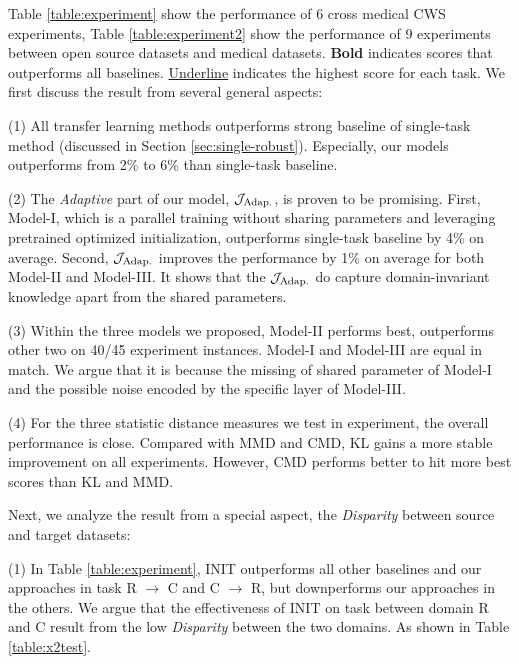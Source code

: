 Table \ref{table:experiment} show the performance of 6 cross medical CWS experiments, Table \ref{table:experiment2} show the performance of 9 experiments between open source datasets and medical datasets. 
\textbf{Bold} indicates scores that outperforms all baselines. \underline{Underline} indicates the highest score for each task.
We first discuss the result from several general aspects:

(1) All transfer learning methods outperforms strong baseline of single-task method (discussed in Section \ref{sec:single-robust}). Especially, our models outperforms from 2\% to 6\% than single-task baseline.

(2) The \textit{Adaptive} part of our model, $\mathcal{J}_\textnormal{Adap.}$, is proven to be promising. First,  Model-\RN{1}, which is a parallel training without sharing parameters and leveraging pretrained optimized initialization, outperforms single-task baseline by 4\% on average. Second, $\mathcal{J}_\textnormal{Adap.}$ improves the performance by 1\% on average for both Model-\RN{2} and Model-\RN{3}. It shows that the $\mathcal{J}_\textnormal{Adap.}$ do capture domain-invariant knowledge apart from the shared parameters. 

(3) Within the three models we proposed, Model-\RN{2} performs best, outperforms other two on 40/45 experiment instances. Model-\RN{1} and Model-\RN{3} are equal in match. We argue that it is because the missing of shared parameter of Model-\RN{1} and the possible noise encoded by the specific layer of Model-\RN{3}.

(4) For the three statistic distance measures we test in experiment, the overall performance is close. Compared with MMD and CMD, KL gains a more stable improvement on all experiments. However, CMD performs better to hit more best scores than KL and MMD.

Next, we analyze the result from a special aspect, the \textit{Disparity} between source and target datasets:

(1) In Table \ref{table:experiment}, INIT outperforms all other baselines and our approaches in task R $\rightarrow$ C and C $\rightarrow$ R, but downperforms our approaches in the others. We argue that the effectiveness of INIT on task between domain R and C result from the low \textit{Disparity} between the two domains. As shown in Table \ref{table:x2test}.

